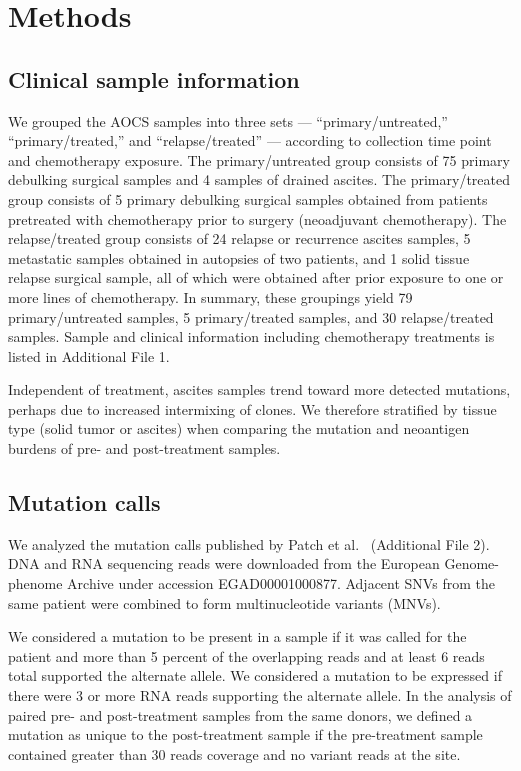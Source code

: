 \section*{Methods}

\subsection*{Clinical sample information}
We grouped the AOCS samples into three sets --- ``primary/untreated,'' ``primary/treated,'' and ``relapse/treated'' --- according to collection time point and chemotherapy exposure. The primary/untreated group consists of 75 primary debulking surgical samples and 4 samples of drained ascites. The primary/treated group consists of 5 primary debulking surgical samples obtained from patients pretreated with chemotherapy prior to surgery (neoadjuvant chemotherapy). The relapse/treated group consists of 24 relapse or recurrence ascites samples, 5 metastatic samples obtained in autopsies of two patients, and 1 solid tissue relapse surgical sample, all of which were obtained after prior exposure to one or more lines of chemotherapy.  In summary, these groupings yield 79 primary/untreated samples, 5 primary/treated samples, and 30 relapse/treated samples. Sample and clinical information including chemotherapy treatments is listed in Additional File 1.

Independent of treatment, ascites samples trend toward more detected mutations, perhaps due to increased intermixing of clones. We therefore stratified by tissue type (solid tumor or ascites) when comparing the mutation and neoantigen burdens of pre- and post-treatment samples.

\subsection*{Mutation calls}
We analyzed the mutation calls published by Patch et al.~\cite{Patch_2015} (Additional File 2). DNA and RNA sequencing reads were downloaded from the European Genome-phenome Archive under accession EGAD00001000877. Adjacent SNVs from the same patient were combined to form multinucleotide variants (MNVs). 

We considered a mutation to be present in a sample if it was called for the patient and more than 5 percent of the overlapping reads and at least 6 reads total supported the alternate allele. We considered a mutation to be expressed if there were 3 or more RNA reads supporting the alternate allele. In the analysis of paired pre- and post-treatment samples from the same donors, we defined a mutation as unique to the post-treatment sample if the pre-treatment sample contained greater than 30 reads coverage and no variant reads at the site.

